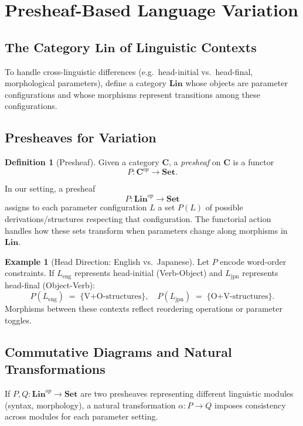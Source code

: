 \documentclass[12pt]{article}
\theoremstyle{plain}
\theoremstyle{definition}
\newtheorem{definition}[theorem]{Definition}
\newtheorem{example}[theorem]{Example}
\begin{document}
\section{Presheaf-Based Language Variation}

\subsection{The Category \texorpdfstring{$\mathbf{Lin}$}{Lin} of Linguistic Contexts}
To handle cross-linguistic differences (e.g.\ head-initial vs.\ head-final, morphological parameters), define a category \(\mathbf{Lin}\) whose objects are parameter configurations and whose morphisms represent transitions among these configurations.

\subsection{Presheaves for Variation}
\begin{definition}[Presheaf]
Given a category \(\mathbf{C}\), a \emph{presheaf} on \(\mathbf{C}\) is a functor
\[
P : \mathbf{C}^{op} \to \mathbf{Set}.
\]
\end{definition}

In our setting, a presheaf
\[
P : \mathbf{Lin}^{op} \to \mathbf{Set}
\]
assigns to each parameter configuration \(L\) a set \(P(L)\) of possible derivations/structures respecting that configuration. The functorial action handles how these sets transform when parameters change along morphisms in \(\mathbf{Lin}\).

\begin{example}[Head Direction: English vs.\ Japanese]
Let \(P\) encode word-order constraints. If \(L_{\mathrm{eng}}\) represents head-initial (Verb-Object) and \(L_{\mathrm{jpn}}\) represents head-final (Object-Verb):
\[
P(L_{\mathrm{eng}})\;=\;\{\text{V+O-structures}\},\quad
P(L_{\mathrm{jpn}})\;=\;\{\text{O+V-structures}\}.
\]
Morphisms between these contexts reflect reordering operations or parameter toggles.
\end{example}

\subsection{Commutative Diagrams and Natural Transformations}
If \(P, Q : \mathbf{Lin}^{op} \to \mathbf{Set}\) are two presheaves representing different linguistic modules (syntax, morphology), a natural transformation \(\alpha : P \to Q\) imposes consistency across modules for each parameter setting.
\end{document}
